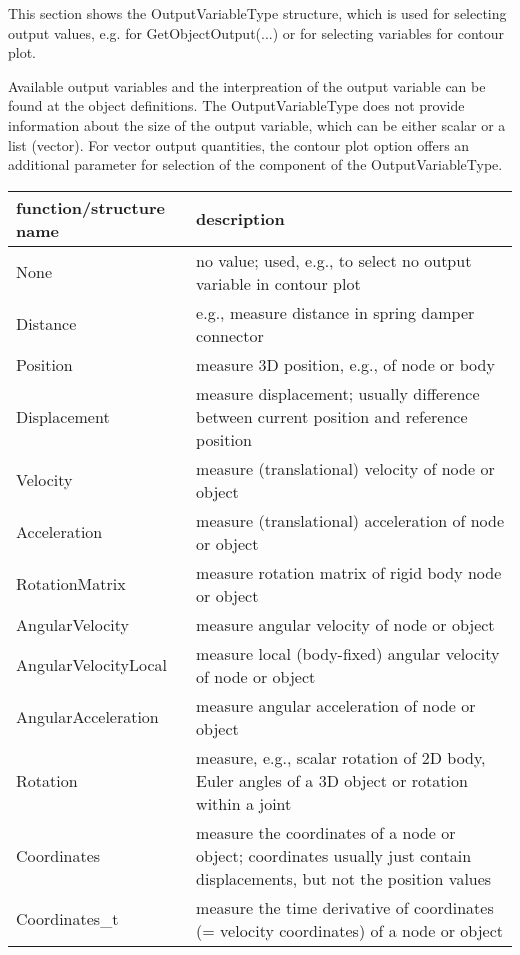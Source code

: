 This section shows the OutputVariableType structure, which is used for selecting output values, e.g. for GetObjectOutput(...) or for selecting variables for contour plot.

Available output variables and the interpreation of the output variable can be found at the object definitions. 
 The OutputVariableType does not provide information about the size of the output variable, which can be either scalar or a list (vector). For vector output quantities, the contour plot option offers an additional parameter for selection of the component of the OutputVariableType.


\begin{center}
\footnotesize
\begin{longtable}{| p{8cm} | p{8cm} |} 
\hline
{\bf function/structure name} & {\bf description}\\ \hline
  None & no value; used, e.g., to select no output variable in contour plot\\ \hline 
  Distance & e.g., measure distance in spring damper connector\\ \hline 
  Position & measure 3D position, e.g., of node or body\\ \hline 
  Displacement & measure displacement; usually difference between current position and reference position\\ \hline 
  Velocity & measure (translational) velocity of node or object\\ \hline 
  Acceleration & measure (translational) acceleration of node or object\\ \hline 
  RotationMatrix & measure rotation matrix of rigid body node or object\\ \hline 
  AngularVelocity & measure angular velocity of node or object\\ \hline 
  AngularVelocityLocal & measure local (body-fixed) angular velocity of node or object\\ \hline 
  AngularAcceleration & measure angular acceleration of node or object\\ \hline 
  Rotation & measure, e.g., scalar rotation of 2D body, Euler angles of a 3D object or rotation within a joint\\ \hline 
  Coordinates & measure the coordinates of a node or object; coordinates usually just contain displacements, but not the position values\\ \hline 
  Coordinates\_t & measure the time derivative of coordinates (= velocity coordinates) of a node or object\\ \hline 

\end{longtable}
\end{center}
